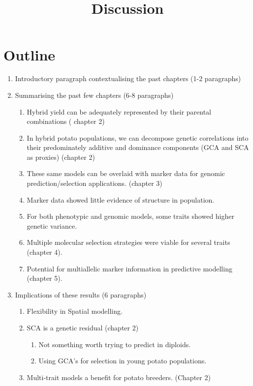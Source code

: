 \documentclass[
]{article}
\title{Discussion}
\author{}
\date{}
\providecommand{\tightlist}{%
  \setlength{\itemsep}{0pt}\setlength{\parskip}{0pt}}\usepackage{longtable,booktabs,array}
\begin{document}
\maketitle


\section{Outline}\label{outline}

\begin{enumerate}
\def\labelenumi{\arabic{enumi}.}
\item
  Introductory paragraph contextualising the past chapters (1-2
  paragraphs)
\item
  Summarising the past few chapters (6-8 paragraphs)

  \begin{enumerate}
  \def\labelenumii{\roman{enumii})}
  \tightlist
  \item
    Hybrid yield can be adequately represented by their parental
    combinations ( chapter 2)
  \item
    In hybrid potato populations, we can decompose genetic correlations
    into their predominately additive and dominance components (GCA and
    SCA as proxies) (chapter 2)
  \item
    These same models can be overlaid with marker data for genomic
    prediction/selection applications. (chapter 3)
  \item
    Marker data showed little evidence of structure in population.
  \item
    For both phenotypic and genomic models, some traits showed higher
    genetic variance.
  \item
    Multiple molecular selection strategies were viable for several
    traits (chapter 4).
  \item
    Potential for multiallelic marker information in predictive
    modelling (chapter 5).
  \end{enumerate}
\item
  Implications of these results (6 paragraphs)

  \begin{enumerate}
  \def\labelenumii{\roman{enumii})}
  \tightlist
  \item
    Flexibility in Spatial modelling.
  \item
    SCA is a genetic residual \autocite{Bernardo2016} (chapter 2)

    \begin{enumerate}
    \def\labelenumiii{\Alph{enumiii}.}
    \tightlist
    \item
      Not something worth trying to predict in diploids.
    \item
      Using GCA's for selection in young potato populations.
    \end{enumerate}
  \item
    Multi-trait models a benefit for potato breeders. (Chapter 2)


\end{enumerate}
\end{enumerate}
\end{document}
